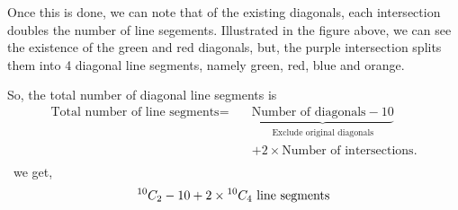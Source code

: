 \begin{case_study}

    Once this is done, we can note that of the existing diagonals, each intersection doubles the number of line segements. Illustrated in the figure above, we can see the existence of the green and red diagonals, but, the purple intersection splits them into 4 diagonal line segments, namely green, red, blue and orange.

    \noindent So, the total number of diagonal line segments is
    \begin{align*}
        \text{Total number of line segments} =
        \quad & \underbrace{\text{Number of diagonals}- 10}_{\substack{\text{Exclude original diagonals}}} \\
              & + 2 \times \text{Number of intersections}.                                                 \\
    \end{align*}
    \therefore\ we get,
    \begin{equation*}
        {}^{10}C_{2} - 10 + 2 \times {}^{10}C_{4} \text{ line segments}
    \end{equation*}

\end{case_study}
